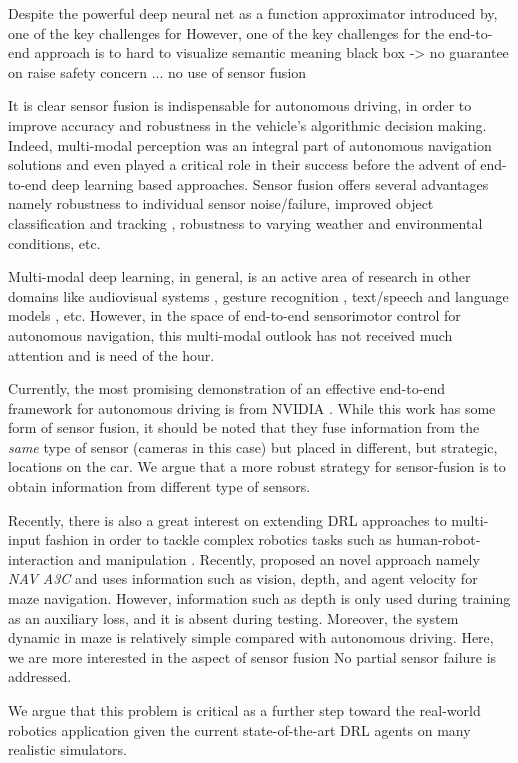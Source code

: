 \documentclass[../thesis.tex]{subfiles}
\begin{document}
Despite the powerful deep neural net as a function approximator introduced by, one of the key challenges for 
However, one of the key challenges for the end-to-end approach is to 
hard to visualize semantic meaning 
black box -> no guarantee on 
raise safety concern ... 
no use of sensor fusion

It is clear sensor fusion is indispensable for autonomous driving, in order to improve accuracy and robustness in the vehicle's algorithmic decision making. Indeed, multi-modal perception was an integral part of autonomous navigation solutions and even played a critical role in their success \cite{multimodaltartan} before the advent of end-to-end deep learning based approaches. Sensor fusion offers several advantages namely robustness to individual sensor noise/failure, improved object classification and tracking \cite{elfring2016multisensor, cho2014multi, darms2008classification}, robustness to varying weather and environmental conditions, etc. 

Multi-modal deep learning, in general, is an active area of research in other domains like audiovisual systems \cite{ngmultimodal}, gesture recognition \cite{moddrop}, text/speech and language models \cite{languagemultimodal,srivastava2012multimodal}, etc. However, in the space of end-to-end sensorimotor control for autonomous navigation, this multi-modal outlook has not received much attention and is need of the hour.

Currently, the most promising demonstration of an effective end-to-end framework for autonomous driving is from NVIDIA \cite{nvidiacar}. While this work has some form of sensor fusion, it should be noted that they fuse information from the \textit{same} type of sensor (cameras in this case) but placed in different, but strategic, locations on the car. We argue that a more robust strategy for sensor-fusion is to obtain information from different type of sensors. 

Recently, there is also a great interest on extending DRL approaches to multi-input fashion in order to tackle complex robotics tasks such as human-robot-interaction \cite{qureshi2016robot} and manipulation \cite{levine2016end}. Recently, \citet{mirowski2017a} proposed an novel approach namely \textit{NAV A3C} and uses information such as vision, depth, and agent velocity for maze navigation. However, information such as depth is only used during training as an auxiliary loss, and it is absent during testing. Moreover, the system dynamic in maze is relatively simple compared with autonomous driving. Here, we are more interested 
in the aspect of sensor fusion
No partial sensor failure is addressed.


We argue that this problem is critical as a further step toward the real-world robotics application given the current state-of-the-art DRL agents on many realistic simulators. 

\end{document}
